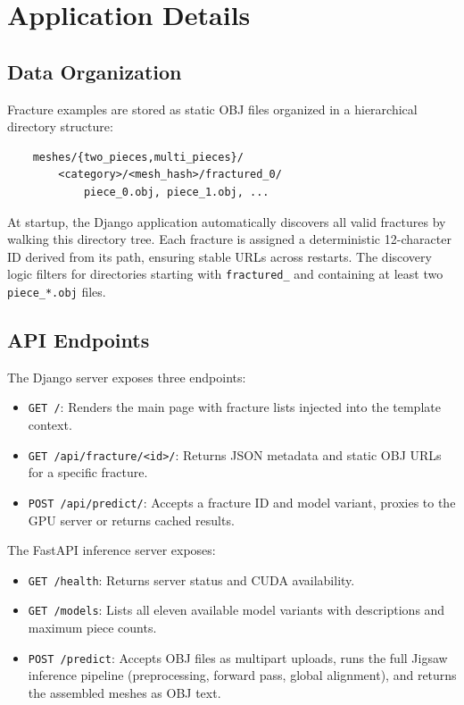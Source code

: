 \appendix
\chapter{Application Details}
\label{app:application}

\section{Data Organization}

Fracture examples are stored as static OBJ files organized in a hierarchical directory structure:

\begin{center}
\small
\begin{verbatim}
    meshes/{two_pieces,multi_pieces}/
        <category>/<mesh_hash>/fractured_0/
            piece_0.obj, piece_1.obj, ...
\end{verbatim}
\end{center}

At startup, the Django application automatically discovers all valid fractures by walking this directory tree. Each fracture is assigned a deterministic 12-character ID derived from its path, ensuring stable URLs across restarts. The discovery logic filters for directories starting with \texttt{fractured\_} and containing at least two \texttt{piece\_*.obj} files.

\section{API Endpoints}

The Django server exposes three endpoints:

\begin{itemize}
    \item \texttt{GET /}: Renders the main page with fracture lists injected into the template context.
    \item \texttt{GET /api/fracture/<id>/}: Returns JSON metadata and static OBJ URLs for a specific fracture.
    \item \texttt{POST /api/predict/}: Accepts a fracture ID and model variant, proxies to the GPU server or returns cached results.
\end{itemize}

The FastAPI inference server exposes:

\begin{itemize}
    \item \texttt{GET /health}: Returns server status and CUDA availability.
    \item \texttt{GET /models}: Lists all eleven available model variants with descriptions and maximum piece counts.
    \item \texttt{POST /predict}: Accepts OBJ files as multipart uploads, runs the full Jigsaw inference pipeline (preprocessing, forward pass, global alignment), and returns the assembled meshes as OBJ text.
\end{itemize}

